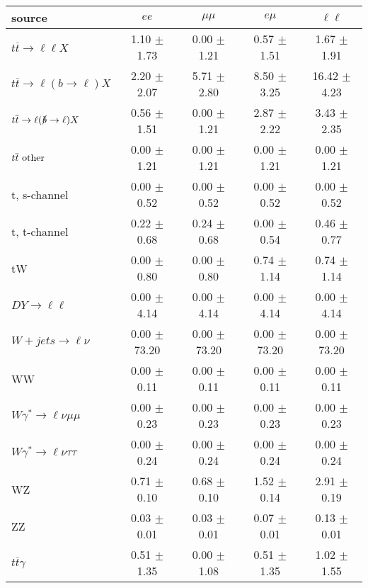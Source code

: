 \begin{tabular}{l|cccc} \hline\hline
source & $ee$ & $\mu\mu$ & $e\mu$ & $\ell\ell $ \\
\hline
$t\overline{t} \rightarrow \ell \ell X$ &  1.10 $\pm$  1.73 &  0.00 $\pm$  1.21 &  0.57 $\pm$  1.51 &  1.67 $\pm$  1.91 \\
$t\overline{t} \rightarrow \ell (b \rightarrow \ell) X$ &  2.20 $\pm$  2.07 &  5.71 $\pm$  2.80 &  8.50 $\pm$  3.25 & 16.42 $\pm$  4.23 \\
$t\overline{t} \rightarrow \ell (\slashed b \rightarrow \ell) X$ &  0.56 $\pm$  1.51 &  0.00 $\pm$  1.21 &  2.87 $\pm$  2.22 &  3.43 $\pm$  2.35 \\
        $t\overline{t}\ \rm{other}$ &  0.00 $\pm$  1.21 &  0.00 $\pm$  1.21 &  0.00 $\pm$  1.21 &  0.00 $\pm$  1.21 \\
\hline
                       t, s-channel &  0.00 $\pm$  0.52 &  0.00 $\pm$  0.52 &  0.00 $\pm$  0.52 &  0.00 $\pm$  0.52 \\
                       t, t-channel &  0.22 $\pm$  0.68 &  0.24 $\pm$  0.68 &  0.00 $\pm$  0.54 &  0.46 $\pm$  0.77 \\
                                 tW &  0.00 $\pm$  0.80 &  0.00 $\pm$  0.80 &  0.74 $\pm$  1.14 &  0.74 $\pm$  1.14 \\
\hline
         $DY \rightarrow \ell \ell$ &  0.00 $\pm$  4.14 &  0.00 $\pm$  4.14 &  0.00 $\pm$  4.14 &  0.00 $\pm$  4.14 \\
      $W+jets \rightarrow \ell \nu$ &  0.00 $\pm$ 73.20 &  0.00 $\pm$ 73.20 &  0.00 $\pm$ 73.20 &  0.00 $\pm$ 73.20 \\
                                 WW &  0.00 $\pm$  0.11 &  0.00 $\pm$  0.11 &  0.00 $\pm$  0.11 &  0.00 $\pm$  0.11 \\
\hline
$W\gamma^{*} \rightarrow \ell \nu \mu\mu$ &  0.00 $\pm$  0.23 &  0.00 $\pm$  0.23 &  0.00 $\pm$  0.23 &  0.00 $\pm$  0.23 \\
$W\gamma^{*} \rightarrow \ell \nu \tau\tau$ &  0.00 $\pm$  0.24 &  0.00 $\pm$  0.24 &  0.00 $\pm$  0.24 &  0.00 $\pm$  0.24 \\
                                 WZ &  0.71 $\pm$  0.10 &  0.68 $\pm$  0.10 &  1.52 $\pm$  0.14 &  2.91 $\pm$  0.19 \\
                                 ZZ &  0.03 $\pm$  0.01 &  0.03 $\pm$  0.01 &  0.07 $\pm$  0.01 &  0.13 $\pm$  0.01 \\
\hline
              $t\overline{t}\gamma$ &  0.51 $\pm$  1.35 &  0.00 $\pm$  1.08 &  0.51 $\pm$  1.35 &  1.02 $\pm$  1.55 \\

\end{tabular}
